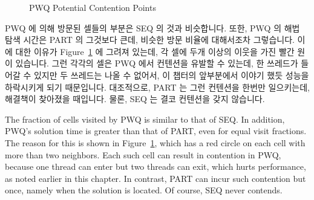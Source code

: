 \fi

\begin{figure}[tb]
\centering
{}
\caption{PWQ Potential Contention Points}
\label{fig:SMPdesign:PWQ Potential Contention Points}
\end{figure}

PWQ 에 의해 방문된 셀들의 부분은 SEQ 의 것과 비슷합니다.
또한, PWQ 의 해법 탐색 시간은 PART 의 그것보다 큰데, 비슷한 방문 비율에
대해서조차 그렇습니다.
이에 대한 이유가
Figure~\ref{fig:SMPdesign:PWQ Potential Contention Points} 에 그려져 있는데, 각
셀에 두개 이상의 이웃을 가진 빨간 원이 있습니다.
그런 각각의 셀은 PWQ 에서 컨텐션을 유발할 수 있는데, 한 쓰레드가 들어갈 수
있지만 두 쓰레드는 나올 수 없어서, 이 챕터의 앞부분에서 이야기 했듯 성능을
하락시키게 되기 때문입니다.
대조적으로, PART 는 그런 컨텐션을 한번만 일으키는데, 해결책이 찾아졌을
때입니다.
물론, SEQ 는 결코 컨텐션을 갖지 않습니다.

\iffalse

The fraction of cells visited by PWQ is similar to that of SEQ\@.
In addition, PWQ's solution time is greater than that of PART,
even for equal visit fractions.
The reason for this is shown in
Figure~\ref{fig:SMPdesign:PWQ Potential Contention Points}, which has a red
circle on each cell with more than two neighbors.
Each such cell can result in contention in PWQ, because
one thread can enter but two threads can exit, which hurts
performance, as noted earlier in this chapter.
In contrast, PART can incur such contention but once, namely
when the solution is located.
Of course, SEQ never contends.

